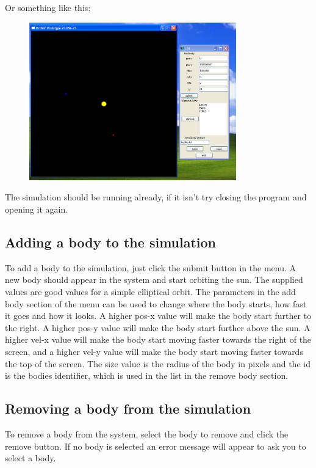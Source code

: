 \documentclass[a4paper,11pt,titlepage]{article}
\begin{document}
Or something like this:

\begin{figure}[H]
	\centering
	\includegraphics[width=0.8\textwidth]{../img/win.png}
\end{figure}
The simulation should be running already, if it isn't try closing the program
and opening it again.

\subsection{Adding a body to the simulation}
To add a body to the simulation, just click the submit button in the menu. A new
body should appear in the system and start  orbiting the sun. The supplied
values are good values for a simple elliptical orbit. The parameters in the add
body section of the menu can be used to change where the body starts, how fast
it goes and how it looks. A higher pos-x value will make the body start further
to the right. A higher pos-y value will make the body start further above the
sun. A higher vel-x value will make the body start moving faster towards the
right of the screen, and a higher vel-y value will make the body start moving
faster towards the top of the screen. The size value is the radius of the body
in pixels and the id is the bodies identifier, which is used in the list in the
remove body section.

\subsection{Removing a body from the simulation}
To remove a body from the system, select the body to remove and click the remove
button. If no body is selected an error message will appear to ask you to select
a body.
\end{document}
